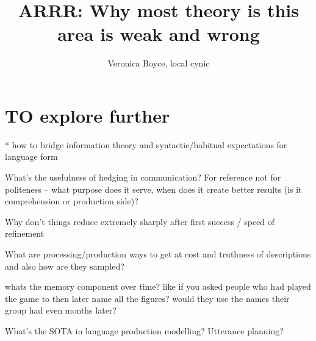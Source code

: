 \documentclass[]{article}
\title{ARRR: Why most theory is this area is weak and wrong}
\author{Veronica Boyce, local cynic}
\begin{document}
\maketitle


\section{TO explore further }

* how to bridge information theory and syntactic/habitual expectations for language form 

What's the usefulness of hedging in communication? For reference not for politeness -- what purpose does it serve, when does it create better results (is it comprehension or production side)? 

Why don't things reduce extremely sharply after first success / speed of refinement

What are processing/production ways to get at cost and truthness of descriptions and also how are they sampled? 

whats the memory component over time? like if you asked people who had played the game to then later name all the figures? would they use the names their group had even months later? 












What's the SOTA in language production modelling? Utterance planning? 
\end{document}
